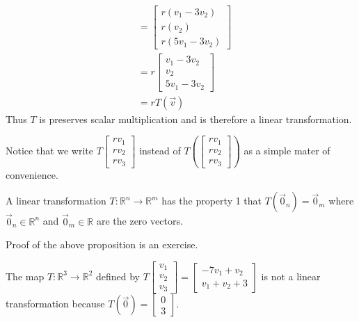 \begin{example}
\begin{align*}
&= \begin{bmatrix}r(v_1-3v_2)\\r(v_2)\\r(5v_1-3v_2)\end{bmatrix}\\
&= r\begin{bmatrix}v_1-3v_2\\v_2\\5v_1-3v_2\end{bmatrix}\\
&= rT(\vec{v})
\end{align*}
Thus $T$ is preserves scalar multiplication and is therefore a linear
transformation.
\end{example}

\begin{remark}
Notice that we write $T\begin{bmatrix}rv_1\\rv_2\\rv_3\end{bmatrix}$ instead 
of  $T\left(\begin{bmatrix}rv_1\\rv_2\\rv_3\end{bmatrix}\right)$ as a simple 
mater of convenience.
\end{remark}
\begin{proposition}
A linear transformation $T:\mathbb{R}^n \to \mathbb{R}^m$ has the property 1
that $T(\vec{0}_n)=\vec{0}_m$ where $\vec{0}_n \in \mathbb{R}^n$ and 
$\vec{0}_m \in \mathbb{R}$ are the zero vectors.
\end{proposition}

Proof of the above proposition is an exercise.

\begin{example}The map $T:\mathbb{R}^3 \to \mathbb{R}^2$ defined by 
$T\begin{bmatrix}v_1 \\ v_2 \\ v_3\end{bmatrix}=\begin{bmatrix}-7v_1+v_2 \\ 
v_1+v_2+3\end{bmatrix}$ 
is not a linear transformation because $T(\vec{0})=\begin{bmatrix}0\\3\end{bmatrix}$.
\end{example}

